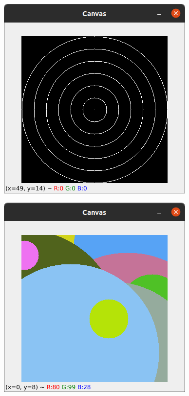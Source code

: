 \documentclass[12pt,letterpaper]{article}
\begin{document}
\begin{multicols}{2}
\begin{figure}[H]
\centering
\includegraphics[width = \columnwidth]{Resultado6_ch5.png}
\end{figure}

\begin{figure}[H]
\centering
\includegraphics[width = \columnwidth]{Resultado7_ch5.png}
\end{figure}


\end{multicols}
\end{document}
